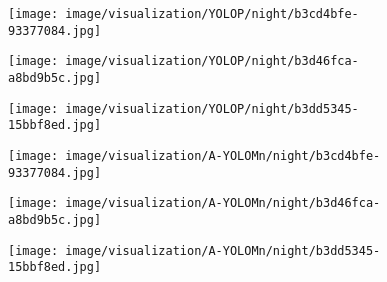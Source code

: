 \documentclass[lettersize,journal]{IEEEtran}
\begin{document}
\begin{figure*}[!h]
    \centering

    \begin{subfigure}[b]{0.05\textwidth}
        \centering
        \vspace{0.6cm} 
    \end{subfigure}\begin{subfigure}{0.25\textwidth}
        \centering
        \texttt{[image: image/visualization/YOLOP/night/b3cd4bfe-93377084.jpg]}
    \end{subfigure}\hspace{0.5cm}
    \begin{subfigure}{0.25\textwidth}
        \centering
        \texttt{[image: image/visualization/YOLOP/night/b3d46fca-a8bd9b5c.jpg]}
    \end{subfigure}\hspace{0.5cm}
    \begin{subfigure}{0.25\textwidth}
        \centering
        \texttt{[image: image/visualization/YOLOP/night/b3dd5345-15bbf8ed.jpg]}
    \end{subfigure}
    
    \medskip
    
    \begin{subfigure}[b]{0.05\textwidth}
        \centering
        \vspace{0.2cm}
    \end{subfigure}\begin{subfigure}{0.25\textwidth}
        \centering
        \texttt{[image: image/visualization/A-YOLOMn/night/b3cd4bfe-93377084.jpg]}
    \end{subfigure}\hspace{0.5cm}
    \begin{subfigure}{0.25\textwidth}
        \centering
        \texttt{[image: image/visualization/A-YOLOMn/night/b3d46fca-a8bd9b5c.jpg]}
    \end{subfigure}\hspace{0.5cm}
    \begin{subfigure}{0.25\textwidth}
        \centering
        \texttt{[image: image/visualization/A-YOLOMn/night/b3dd5345-15bbf8ed.jpg]}
    \end{subfigure}

    \medskip
    

\end{figure*}
\end{document}
